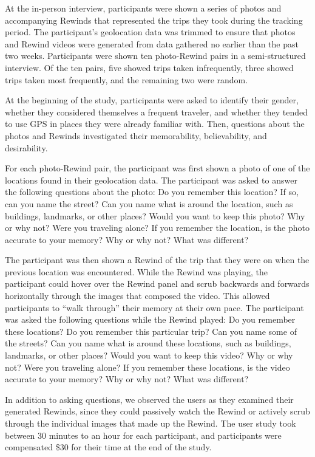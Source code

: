 \documentclass{sigchi}
\begin{document}
At the in-person interview, participants were shown a series of photos and accompanying Rewinds that represented the trips they took during the tracking period. The participant's geolocation data was trimmed to ensure that photos and Rewind videos were generated from data gathered no earlier than the past two weeks. Participants were shown ten photo-Rewind pairs in a semi-structured interview.  Of the ten pairs, five showed trips taken infrequently, three showed trips taken most frequently, and the remaining two were random. 

At the beginning of the study, participants were asked to identify their gender, whether they considered themselves a frequent traveler, and whether they tended to use GPS in places they were already familiar with.
Then, questions about the photos and Rewinds investigated their memorability, believability, and desirability.

For each photo-Rewind pair, the participant was first shown a photo of one of the locations found in their geolocation data. The participant was asked to answer the following questions about the photo: Do you remember this location? If so, can you name the street? Can you name what is around the location, such as buildings, landmarks, or other places? Would you want to keep this photo? Why or why not? Were you traveling alone? If you remember the location, is the photo accurate to your memory? Why or why not? What was different?

The participant was then shown a Rewind of the trip that they were on when the previous location was encountered. While the Rewind was playing, the participant could hover over the Rewind panel and scrub backwards and forwards horizontally through the images that composed the video. This allowed participants to ``walk through'' their memory at their own pace. The participant was asked the following questions while the Rewind played: Do you remember these locations? Do you remember this particular trip? Can  you name some of the streets? Can you name what is around these locations, such as buildings, landmarks, or other places? Would you want to keep this video? Why or why not? Were you traveling alone? If you remember these locations, is the video accurate to your memory? Why or why not? What was different?

In addition to asking questions, we observed the users as they examined their generated Rewinds, since they could passively watch the Rewind or actively scrub through the individual images that made up the Rewind. The user study took between 30 minutes to an hour for each participant, and participants were compensated \$30 for their time at the end of the study.
\end{document}
